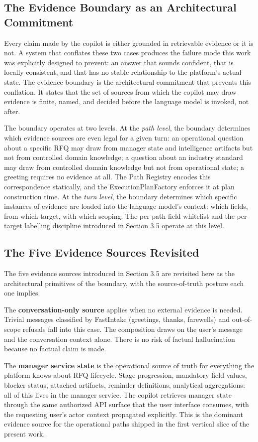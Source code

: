 \subsection*{The Evidence Boundary as an Architectural Commitment}
Every claim made by the copilot is either grounded in retrievable evidence or it is not. A system that conflates these two cases produces the failure mode this work was explicitly designed to prevent: an answer that sounds confident, that is locally consistent, and that has no stable relationship to the platform's actual state. The evidence boundary is the architectural commitment that prevents this conflation. It states that the set of sources from which the copilot may draw evidence is finite, named, and decided before the language model is invoked, not after.

The boundary operates at two levels. At the \textit{path level}, the boundary determines which evidence sources are even legal for a given turn: an operational question about a specific RFQ may draw from manager state and intelligence artifacts but not from controlled domain knowledge; a question about an industry standard may draw from controlled domain knowledge but not from operational state; a greeting requires no evidence at all. The Path Registry encodes this correspondence statically, and the ExecutionPlanFactory enforces it at plan construction time. At the \textit{turn level}, the boundary determines which specific instances of evidence are loaded into the language model's context: which fields, from which target, with which scoping. The per-path field whitelist and the per-target labelling discipline introduced in Section 3.5 operate at this level.

\subsection*{The Five Evidence Sources Revisited}
The five evidence sources introduced in Section 3.5 are revisited here as the architectural primitives of the boundary, with the source-of-truth posture each one implies.

The \textbf{conversation-only source} applies when no external evidence is needed. Trivial messages classified by FastIntake (greetings, thanks, farewells) and out-of-scope refusals fall into this case. The composition draws on the user's message and the conversation context alone. There is no risk of factual hallucination because no factual claim is made.

The \textbf{manager service state} is the operational source of truth for everything the platform knows about RFQ lifecycle. Stage progression, mandatory field values, blocker status, attached artifacts, reminder definitions, analytical aggregations: all of this lives in the manager service. The copilot retrieves manager state through the same authorized API surface that the user interface consumes, with the requesting user's actor context propagated explicitly. This is the dominant evidence source for the operational paths shipped in the first vertical slice of the present work.

